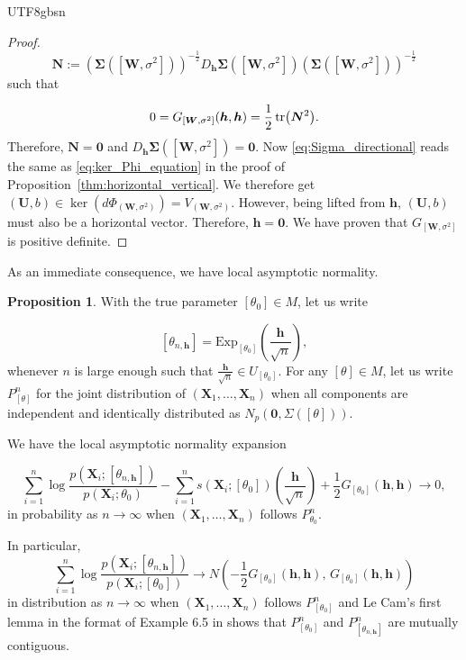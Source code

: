 \documentclass[12pt]{report}
\newcommand{\bracket}[1]{\left ( #1 \right )}
\newcommand{\squared}[1]{\left [ #1 \right ]}
\theoremstyle{plain}
\theoremstyle{definition}
\newtheorem{proposition}[theorem]{Proposition}
\begin{document}
\begin{CJK*}{UTF8}{gbsn}
\begin{proof}
\begin{equation*}
  \bm{N} := \bracket{\bm{\Sigma}([\bm{W},\sigma^2])}^{-\frac{1}{2}}
  D_{\bm{h}}\bm{\Sigma}([\bm{W},\sigma^2]) 
  \bracket{\bm{\Sigma}([\bm{W},\sigma^2])}^{-\frac{1}{2}}
\end{equation*}
such that 

\begin{equation*}
  0=G_{[\bm{W},\sigma^2]}(\bm{h},\bm{h}) = 
  \frac{1}{2}\tr(\bm{N}^2).
\end{equation*}
Therefore, $\bm{N} = \bm{0}$
and $D_{\bm{h}}\bm{\Sigma}([\bm{W},\sigma^2]) = \bm{0}$.
Now \eqref{eq:Sigma_directional}
reads the same as \eqref{eq:ker_Phi_equation}
in the proof of Proposition~\ref{thm:horizontal_vertical}.
We therefore get $(\bm{U},b) \in \ker(d\Phi_{(\bm{W},\sigma^2)}) = V_{(\bm{W},\sigma^2)}$.
However, being lifted from $\bm{h}$,
$(\bm{U},b)$ must also be a horizontal vector.
Therefore, $\bm{h} = \bm{0}$.
We have proven that $G_{[\bm{W},\sigma^2]}$ is positive definite.
\end{proof}

As an immediate consequence, we have  
local asymptotic normality.

\begin{proposition}\label{thm:LAN}
With the true parameter $[\theta_0] \in M$,
let us write

\begin{equation}\label{eq:theta_n_h}
  \squared{\theta_{n, \bm{h}}} = \text{Exp}_{[\theta_0]} \bracket{\frac{\bm{h}}{\sqrt{n}}},
\end{equation}
whenever $n$ is large enough such that $\frac{\bm{h}}{\sqrt{n}} \in U_{[\theta_0]}$.
For any $[\theta] \in M$, 
let us write $P^n_{[\theta]}$
for the joint distribution of $(\bm{X}_1, \ldots, \bm{X}_n)$
when all components are independent and 
identically distributed as $N_p(\bm{0}, \Sigma([\theta]))$.

We have the local asymptotic normality expansion

\begin{equation}\label{eq:LAN_prob_convergence}
  \sum_{i=1}^n \log \frac{p\bracket{\bm{X}_i; \squared{\theta_{n, \bm{h}}}}}{p(\bm{X}_i; \theta_0)}
  - \sum_{i=1}^n s(\bm{X}_i;[\theta_0])\bracket{\frac{\bm{h}}{\sqrt{n}}}
  + \frac{1}{2} G_{[\theta_0]}(\bm{h},\bm{h}) \to 0,
\end{equation}
in probability as $n \to \infty$ when 
$(\bm{X}_1, \ldots, \bm{X}_n)$ follows $P^n_{\theta_0}$.

In particular,
\begin{equation}\label{eq:LAN_weak_convergence}
  \sum_{i=1}^n \log \frac{p\bracket{\bm{X}_i; \squared{\theta_{n, \bm{h}}}}}{p(\bm{X}_i; [\theta_0])}
  \to N \bracket{-\frac{1}{2}G_{[\theta_0]}(\bm{h},\bm{h}), \, G_{[\theta_0]}(\bm{h},\bm{h})}
\end{equation}
in distribution as $n \to \infty$
when $(\bm{X}_1, \ldots, \bm{X}_n)$ follows $P^n_{[\theta_0]}$
and
Le Cam's first lemma in the format of Example 6.5 in \cite{van_der_Vaart_1998}
shows that $P^n_{\squared{\theta_0}}$
and $P^n_{\squared{\theta_{n, \bm{h}}}}$ are mutually contiguous.
\end{proposition}


\end{CJK*}
\end{document}
